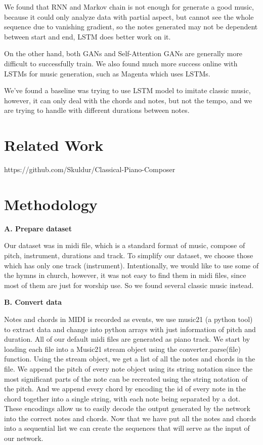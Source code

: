 \documentclass[10pt,twocolumn,letterpaper]{article}
\begin{document}
We found that RNN and Markov chain is not enough for generate a good music, because it could only analyze data with partial aspect, but cannot see the whole sequence due to vanishing gradient, so the notes generated may not be dependent between start and end, LSTM does better work on it.

On the other hand, both GANs and Self-Attention GANs are generally more difficult to successfully train. We also found much more success online with LSTMs for music generation, such as Magenta which uses LSTMs.

We’ve found a baseline was trying to use LSTM model to imitate classic music, however, it can only deal with the chords and notes, but not the tempo, and we are trying to handle with different durations between notes.

\section{Related Work}
https://github.com/Skuldur/Classical-Piano-Composer


\section{Methodology}
\noindent
\textbf{A. Prepare dataset}

Our dataset was in midi file, which is a standard format of music, compose of pitch, instrument, durations and track. To simplify our dataset, we choose those which has only one track (instrument). Intentionally, we would like to use some of the hymns in church, however, it was not easy to find them in midi files, since most of them are just for worship use. So we found several classic music instead.

\noindent
\textbf{B. Convert data}

Notes and chords in MIDI is recorded as events, we use music21 (a python tool) to extract data and change into python arrays with just information of pitch and duration. All of our default midi files are generated as piano track. 
We start by loading each file into a Music21 stream object using the converter.parse(file) function. Using the stream object, we get a list of all the notes and chords in the file. We append the pitch of every note object using its string notation since the most significant parts of the note can be recreated using the string notation of the pitch. And we append every chord by encoding the id of every note in the chord together into a single string, with each note being separated by a dot. These encodings allow us to easily decode the output generated by the network into the correct notes and chords.
Now that we have put all the notes and chords into a sequential list we can create the sequences that will serve as the input of our network.
\end{document}

